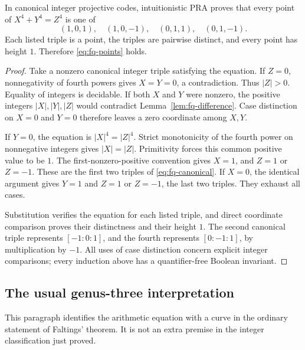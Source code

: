 \begin{theorem}
\label{thm:fq-complete}
In canonical integer projective codes, intuitionistic PRA proves that
every point of $X^4+Y^4=Z^4$ is one of
\[
 (1,0,1),\quad (1,0,-1),\quad (0,1,1),\quad (0,1,-1).
 \tag{F9}\label{eq:fq-canonical}
\]
Each listed triple is a point, the triples are pairwise distinct, and
every point has height $1$.  Therefore \eqref{eq:fq-points} holds.
\end{theorem}

\begin{proof}
Take a nonzero canonical integer triple satisfying the equation.
If $Z=0$, nonnegativity of fourth powers gives $X=Y=0$, a
contradiction.  Thus $|Z|>0$.  Equality of integers is decidable.
If both $X$ and $Y$ were nonzero, the positive integers
$|X|,|Y|,|Z|$ would contradict Lemma~\ref{lem:fq-difference}.
Case distinction on $X=0$ and $Y=0$ therefore leaves a zero
coordinate among $X,Y$.

If $Y=0$, the equation is $|X|^4=|Z|^4$.  Strict monotonicity of
the fourth power on nonnegative integers gives $|X|=|Z|$.
Primitivity forces this common positive value to be $1$.  The
first-nonzero-positive convention gives $X=1$, and $Z=1$ or $Z=-1$.
These are the first two triples of \eqref{eq:fq-canonical}.
If $X=0$, the identical argument gives $Y=1$ and $Z=1$ or $Z=-1$,
the last two triples.  They exhaust all cases.

Substitution verifies the equation for each listed triple, and direct
coordinate comparison proves their distinctness and their height $1$.
The second canonical triple represents $[-1:0:1]$, and the fourth
represents $[0:-1:1]$, by multiplication by $-1$.
All uses of case distinction concern explicit integer comparisons;
every induction above has a quantifier-free Boolean invariant.
\end{proof}

\subsection{The usual genus-three interpretation}

This paragraph identifies the arithmetic equation with a curve in the
ordinary statement of Faltings' theorem.  It is not an extra premise in
the integer classification just proved.

